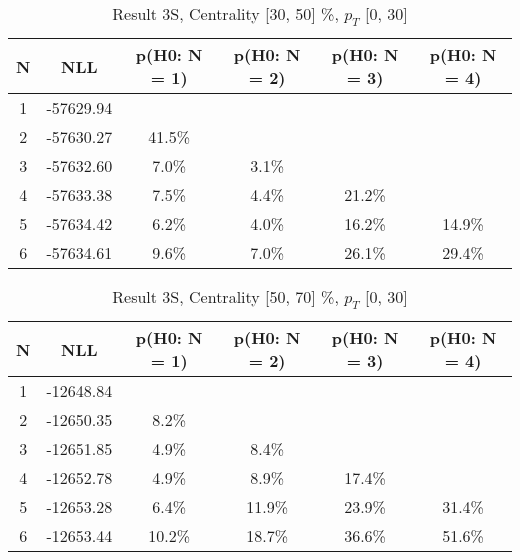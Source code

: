 \begin{table}[htb]
	\begin{center}
	\caption{Result 3S, Centrality [30, 50] \%, $p_{T}$ [0, 30] \GeV
}
{\footnotesize\renewcommand{\arraystretch}{1.4}
		\begin{tabular}{cc||>{\columncolor[gray]{0.8}}cccc}
			N & NLL & p(H0: N = 1) & p(H0: N = 2) & p(H0: N = 3) & p(H0: N = 4)\\ 
		\hline
1 & -57629.94 & & & & \\
2 & -57630.27 & 41.5\% & & & \\
3 & -57632.60 & 7.0\% & 3.1\% & & \\
4 & -57633.38 & 7.5\% & 4.4\% & 21.2\% & \\
5 & -57634.42 & 6.2\% & 4.0\% & 16.2\% & 14.9\% \\
6 & -57634.61 & 9.6\% & 7.0\% & 26.1\% & 29.4\% \\
	\end{tabular}
		\label{tab:lab}
	}
	\end{center}\end{table}

\begin{table}[htb]
	\begin{center}
	\caption{Result 3S, Centrality [50, 70] \%, $p_{T}$ [0, 30] \GeV
}
{\footnotesize\renewcommand{\arraystretch}{1.4}
		\begin{tabular}{cc||c>{\columncolor[gray]{0.8}}ccc}
			N & NLL & p(H0: N = 1) & p(H0: N = 2) & p(H0: N = 3) & p(H0: N = 4)\\ 
		\hline
1 & -12648.84 & & & & \\
2 & -12650.35 & 8.2\% & & & \\
3 & -12651.85 & 4.9\% & 8.4\% & & \\
4 & -12652.78 & 4.9\% & 8.9\% & 17.4\% & \\
5 & -12653.28 & 6.4\% & 11.9\% & 23.9\% & 31.4\% \\
6 & -12653.44 & 10.2\% & 18.7\% & 36.6\% & 51.6\% \\
	\end{tabular}
		\label{tab:lab}
	}
	\end{center}\end{table}

